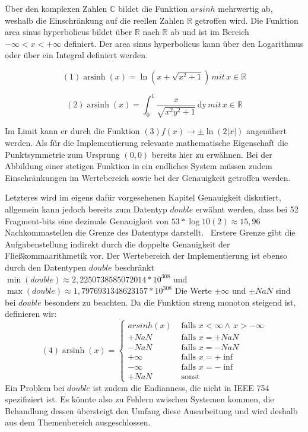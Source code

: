 \documentclass[course=erap] {aspdoc}
\begin{document}
    Über den komplexen Zahlen $\mathbb{C}$ bildet die Funktion $arsinh$ mehrwertig ab, weshalb die Einschränkung auf die reellen Zahlen $\mathbb{R}$ getroffen wird.
    Die Funktion area sinus hyperbolicus bildet über $\mathbb{R}$ nach $\mathbb{R}$ ab und ist im Bereich $-\infty < x < + \infty$ definiert.
    Der area sinus hyperbolicus kann über den Logarithmus oder über ein Integral definiert werden.

    $$ (1) \operatorname{arsinh}(x) = \ln \left(x + \sqrt{x^2 + 1} \right) \, mit \, x \in \mathbb{R}$$

    $$ (2) \operatorname{arsinh}(x) = \int_{0}^{1} \frac{x}{\sqrt{x^2 y^2 + 1}} \,\mathrm{dy} \, mit \, x \in \mathbb{R} $$

    Im Limit kann er durch die Funktion $ (3) f(x)\to \pm \ln(2|x|)$ angenähert werden.
    Als für die Implementierung relevante mathematische Eigenschaft die Punktsymmetrie zum Ursprung $(0,0)$ bereits hier zu erwähnen.
    Bei der Abbildung einer stetigen Funktion in ein endliches System müssen zudem Einschränkungen im Wertebereich sowie bei der Genauigkeit getroffen werden.

    Letzteres wird im eigens dafür vorgesehenen Kapitel Genauigkeit diskutiert, allgemein kann jedoch bereits zum Datentyp $double$ erwähnt werden, dass bei 52 Fragment-bits eine dezimale Genauigkeit von $53*\log10(2) \approx 15,96$ Nachkommastellen die Grenze des Datentyps darstellt.~\cite{StandardforBinaryFloating}
    Erstere Grenze gibt die Aufgabenstellung indirekt durch die doppelte Genauigkeit der Fließkommaarithmetik vor.
    Der Wertebereich der Implementierung ist ebenso durch den Datentypen $double$ beschränkt $\min(double) \approx 2,2250738585072014* 10^{308}$ und $\max(double) \approx 1,7976931348623157 * 10^{308}$
    Die Werte $\pm \infty$ und $\pm NaN$ sind bei $double$ besonders zu beachten.
    Da die Funktion streng monoton steigend ist, definieren wir:
    \[(4) \operatorname{arsinh}(x) =
    \begin{cases}
        arsinh(x)     & \text{ falls } x < \infty \wedge \, x > -\infty \\
        +NaN  & \text{ falls } x = +NaN \\
        -NaN  & \text{ falls } x = -NaN \\
        +\infty     & \text{ falls } x = +\inf \\
        -\infty     & \text{ falls } x = -\inf \\
        +NaN     & \text{ sonst }

    \end{cases}\]
    Ein Problem bei $double$ ist zudem die Endianness, die nicht in IEEE 754~\cite{StandardforBinaryFloating-PointArithmetic} spezifiziert ist.
    Es könnte also zu Fehlern zwischen Systemen kommen, die Behandlung dessen übersteigt den Umfang diese Ausarbeitung und wird deshalb aus dem Themenbereich ausgeschlossen.
\end{document}
